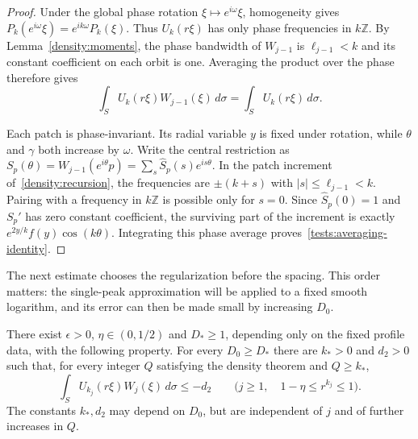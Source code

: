 \begin{proof}
Under the global phase rotation $\xi\mapsto e^{i\omega}\xi$,
homogeneity gives $P_k(e^{i\omega}\xi)=e^{ik\omega}P_k(\xi)$.
Thus $U_k(r\xi)$ has only phase frequencies in $k\mathbb Z$.
By Lemma~\ref{density:moments}, the phase bandwidth of $W_{j-1}$
is $\ell_{j-1}<k$ and its constant coefficient on each orbit is one.
Averaging the product over the phase therefore gives
\[
 \int_S U_k(r\xi)W_{j-1}(\xi)\,d\sigma
 =\int_S U_k(r\xi)\,d\sigma.
\]

Each patch is phase-invariant.  Its radial variable $y$ is fixed
under rotation, while $\theta$ and $\gamma$ both increase by $\omega$.
Write the central restriction as
$S_p(\theta)=W_{j-1}(e^{i\theta}p)
 =\sum_s\widehat S_p(s)e^{is\theta}$.
In the patch increment of~\eqref{density:recursion}, the frequencies
are $\pm(k+s)$ with $|s|\le\ell_{j-1}<k$.  Pairing with a frequency in
$k\mathbb Z$ is possible only for $s=0$.
Since $\widehat S_p(0)=1$ and $S_p'$ has zero constant coefficient,
the surviving part of the increment
is exactly $e^{2y/k}f(y)\cos(k\theta)$.  Integrating this phase average
proves~\eqref{tests:averaging-identity}.
\end{proof}

The next estimate chooses the regularization before the spacing.
This order matters: the single-peak approximation will be applied
to a fixed smooth logarithm, and its error can then be made small by
increasing $D_0$.

\begin{proposition}\label{tests:negative}
There exist $\epsilon>0$, $\eta\in(0,1/2)$ and $D_*\ge1$, depending
only on the fixed profile data, with the following property.
For every $D_0\ge D_*$ there are $k_*>0$ and $d_2>0$ such that, for
every integer $Q$ satisfying the density theorem and $Q\ge k_*$,
\begin{equation}\label{tests:one-scale-negative}
 \int_S U_{k_j}(r\xi)W_j(\xi)\,d\sigma\le-d_2
 \qquad
 \bigl(j\ge1,\quad 1-\eta\le r^{k_j}\le1\bigr).
\end{equation}
The constants $k_*,d_2$ may depend on $D_0$, but are independent of
$j$ and of further increases in $Q$.
\end{proposition}

